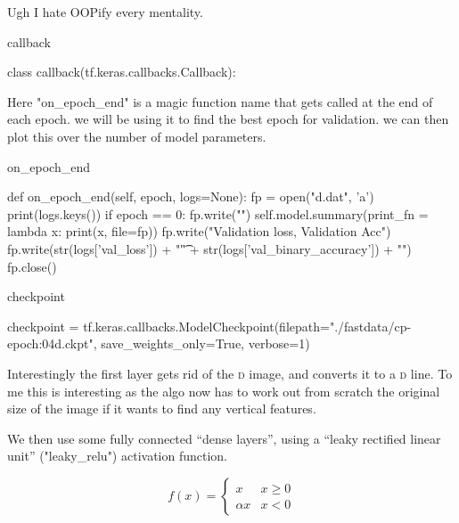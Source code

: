 \documentclass[10pt, a4paper]{article}
\begin{document}
Ugh I hate OOPify every mentality. 

\begin{codeblock}{callback}
\begin{code}
class callback(tf.keras.callbacks.Callback):
\end{code}

Here "on_epoch_end" is a magic function name that gets called at the end of each epoch. we will be using it to find the best epoch for validation. we can then plot this over the number of model parameters.

\begin{codeblock}{on_epoch_end}
\begin{code}
	def on_epoch_end(self, epoch, logs=None):
		fp = open("d.dat", 'a')
		print(logs.keys())
		if epoch == 0:
			fp.write("\n")
			self.model.summary(print_fn = lambda x: print(x, file=fp))
			fp.write("Validation loss, Validation Acc\n")
		fp.write(str(logs['val_loss']) + "\t" + str(logs['val_binary_accuracy']) + "\n")
		fp.close()
\end{code}
		
\end{codeblock}
\end{codeblock}

\begin{codevar}{checkpoint}
\begin{code}
checkpoint = tf.keras.callbacks.ModelCheckpoint(filepath="./fastdata/cp-{epoch:04d}.ckpt",
                                                 save_weights_only=True,
                                                 verbose=1)
\end{code}
\end{codevar}

Interestingly the first layer gets rid of the \textsc{d} image, and converts it to a \textsc{d} line. 
To me this is interesting as the algo now has to work out from scratch the original size of the image if it wants to find any vertical features. 

We then use some fully connected ``dense layers'', using a ``leaky rectified linear unit'' ("leaky_relu") activation function. 

\begin{equation}
f(x) = \begin{cases} x & x \geq 0 \\ \alpha x & x < 0 \end{cases}
\end{equation}
\end{document}
